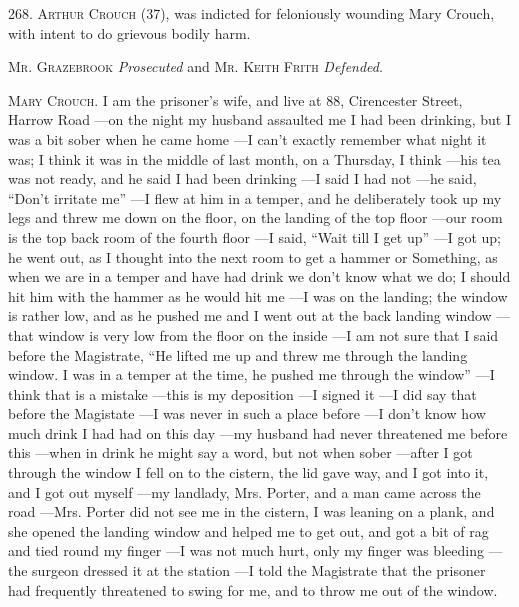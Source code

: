 {
    \setlength{\parindent}{0em}
    \setlength{\parskip}{1em}
    \renewcommand*{\sideparfont}{\footnotesize\itshape}

    268. \textsc{Arthur Crouch} (37), was indicted for feloniously wounding Mary Crouch, with intent to do grievous bodily harm.

    \textsc{Mr. Grazebrook} \textit{Prosecuted} and \textsc{Mr. Keith Frith} \textit{Defended}.

    \textsc{Mary Crouch}. I am the prisoner's wife, and live at 88, Cirencester Street, Harrow Road
    ---on the night my husband assaulted me I had been drinking, but I was a bit sober when he came home
    ---I can't exactly remember what night it was; I think it was in the middle of last month, on a Thursday, I think
    ---his tea was not ready, and he said I had been drinking
    ---I said I had not
    ---he said, ``Don't irritate me''
    ---I flew at him in a temper, and he deliberately took up my legs and threw me down on the floor, on the landing of the top floor
    ---our room is the top back room of the fourth floor
    ---I said, ``Wait till I get up''
    ---I got up; he went out, as I thought into the next room to get a hammer or Something, as when we are in a temper and have had drink we don't know what we do; I should hit him with the hammer as he would hit me
    ---I was on the landing; the window is rather low, and as he pushed me and I went out at the back landing window
    ---that window is very low from the floor on the inside
    ---I am not sure that I said before the Magistrate, ``He lifted me up and threw me through the landing window. I was in a temper at the time, he pushed me through the window''
    ---I think that is a mistake
    ---this is my deposition
    ---I signed it
    ---I did say that before the Magistate
    ---I was never in such a place before
    ---I don't know how much drink I had had on this day
    ---my husband had never threatened me before this
    ---when in drink he might say a word, but not when sober
    ---after I got through the window I fell on to the cistern, the lid gave way, and I got into it, and I got out myself
    ---my landlady, Mrs. Porter, and a man came across the road
    ---Mrs. Porter did not see me in the cistern, I was leaning on a plank, and she opened the landing window and helped me to get out, and got a bit of rag and tied round my finger
    ---I was not much hurt, only my finger was bleeding
    ---the surgeon dressed it at the station
    ---I told the Magistrate that the prisoner had frequently threatened to swing for me, and to throw me out of the window.

}
